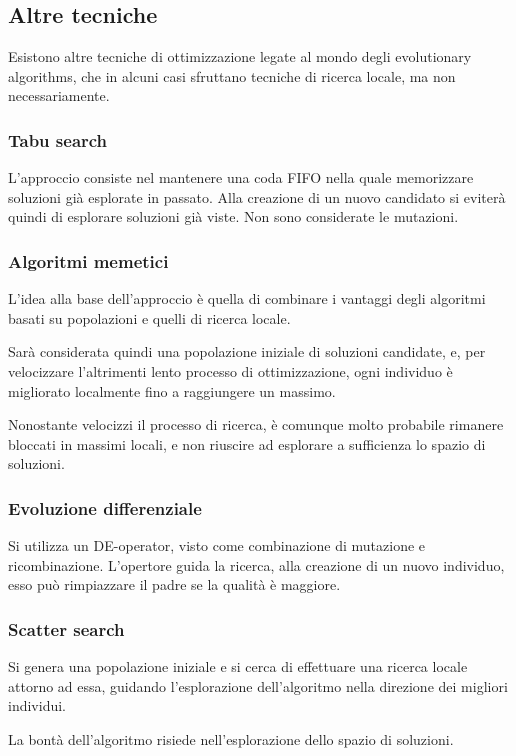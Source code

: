 \documentclass[a4paper]{article}
\begin{document}
\subsection{Altre tecniche}
Esistono altre tecniche di ottimizzazione legate al mondo degli 
evolutionary algorithms, che in alcuni casi sfruttano tecniche di ricerca locale, 
ma non necessariamente.

\subsubsection{Tabu search}
L'approccio consiste nel mantenere una coda FIFO nella quale memorizzare 
soluzioni già esplorate in passato.
Alla creazione di un nuovo candidato si eviterà quindi di esplorare soluzioni già viste.
Non sono considerate le mutazioni.

\subsubsection{Algoritmi memetici}
L'idea alla base dell'approccio è quella di combinare i vantaggi degli algoritmi 
basati su popolazioni e quelli di ricerca locale.

Sarà considerata quindi una popolazione iniziale di soluzioni candidate, e, per
velocizzare l'altrimenti lento processo di ottimizzazione, ogni individuo è migliorato 
localmente fino a raggiungere un massimo.

Nonostante velocizzi il processo di ricerca, è comunque molto probabile rimanere bloccati 
in massimi locali, e non riuscire ad esplorare a sufficienza lo spazio di soluzioni.

\subsubsection{Evoluzione differenziale}
Si utilizza un DE-operator, visto come combinazione di mutazione e ricombinazione.
L'opertore guida la ricerca, alla creazione di un nuovo individuo, esso può rimpiazzare
il padre se la qualità è maggiore.

\subsubsection{Scatter search}
Si genera una popolazione iniziale e si cerca di effettuare una ricerca locale attorno ad 
essa, guidando l'esplorazione dell'algoritmo nella direzione dei migliori individui.

La bontà dell'algoritmo risiede nell'esplorazione dello spazio di soluzioni.
\end{document}
